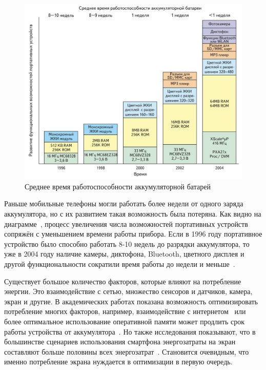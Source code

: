 \documentclass[a4paper,14pt]{extarticle} %
\begin{document}
	\begin{figure}[htb]
		\includegraphics[width=\textwidth]{portable_time}
		\caption{Среднее время работоспособности аккумуляторной батарей}
		\label{fig:portable_time}
	\end{figure}
	
	Раньше мобильные телефоны могли работать более недели от одного заряда аккумулятора, но с их развитием такая возможность была потеряна. Как видно на диаграмме~\ris{\ref{fig:portable_time}}, процесс увеличения числа возможностей портативных устройств сопряжён с уменьшением времени работы прибора. Если в 1996 году портативное устройство было способно работать 8-10 недель до разрядки аккумулятора, то уже в 2004 году наличие камеры, диктофона, Bluetooth, цветного дисплея и другой функциональности сократили время работы до недели и меньше~\parencite{василенко2005методы}.
	
	Существует большое количество факторов, которые влияют на потребление энергии. Это взаимодействие с сетью, множество сенсоров и датчиков, камера, экран и другие. В академических работах показана возможность оптимизировать потребление многих факторов, например, взаимодействие с интернетом~\parencite{tuysuz2019real} или более оптимальное использование оперативной памяти может продлить срок работы устройства от аккумулятора~\parencite{li2014investigation}. Но также исследования показывают, что в большинстве сценариев использования смартфона энергозатраты на экран составляют больше половины всех энергозатрат~\parencite{bai2013android}. Становится очевидным, что именно потребление экрана нуждается в оптимизации в первую очередь.
	
\end{document}
